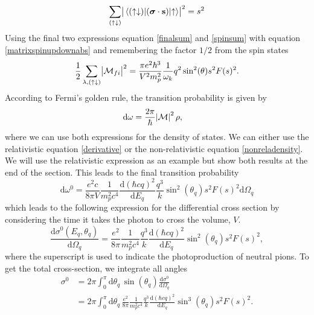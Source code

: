 \begin{equation} \label{spinsum}
	\sum_{(\uparrow\downarrow)} \abs{\mel*{(\uparrow\downarrow)}{(\bm{\mathrm{\sigma}}\cdot\bm{\mathrm{s}})}{\uparrow}}^2 = s^2
\end{equation}
Using the final two expressions equation \eqref{finalsum} and \eqref{spinsum} with equation \eqref{matrixspinupdownabs} and remembering the factor $1/2$ from the spin states
\begin{equation} \label{absmatrixexact}
	\frac{1}{2}\sum_{\lambda,(\uparrow\downarrow)} \abs{\mathcal{M}_{fi}}^2 = \frac{\pi e^2\hbar^3}{V^2 m_p^2}\frac{1}{\omega_k} q^2\sin^2(\theta) s^2 F(s)^2.
\end{equation}
According to Fermi's golden rule, the transition probability is given by
\begin{align}\label{Fermisgolden}
	\text{d}\omega &= \frac{2\pi}{\hbar}\abs{\mathcal{M}}^2\rho,
\end{align}
where we can use both expressions for the density of states. We can either use the relativistic equation \eqref{derivative} or the non-relativistic equation \eqref{nonreladensity}. We will use the relativistic expression as an example but show both results at the end of the section. This leads to the final transition probability
\begin{equation}
	\text{d}\omega^0 = \frac{e^2c}{8\pi V}\frac{1}{m_p^2 c^4}\frac{\text{d}(\hbar c q)^2}{\text{d}E_q}\frac{q^3}{k} \sin^2(\theta_q) s^2 F(s)^2 \text{d}\Omega_q
\end{equation}
which leads to the following expression for the differential cross section by considering the time it takes the photon to cross the volume, $V$.
\begin{equation}\label{exactdiffcross}
	\frac{\text{d}\sigma^0(E_q,\theta_q)}{\text{d}\Omega_q} = \frac{e^2}{8\pi}\frac{1}{m_p^2c^4}\frac{q^3}{k}\frac{\text{d}(\hbar c q)^2}{\text{d}E_q}\sin^2(\theta_q) s^2 F(s)^2,
\end{equation}
where the superscript is used to indicate the photoproduction of neutral pions. To get the total cross-section, we integrate all angles
\begin{align} \label{exactcross}
	\sigma^0 & = 2\pi \int_0^\pi \text{d}\theta_q \, \sin(\theta_q) \frac{\text{d}\sigma^0}{\text{d}\Omega_q} \\ &= 2\pi \int_0^\pi \text{d}\theta_q \, \frac{e^2}{8\pi}\frac{1}{m_p^2c^4}\frac{q^3}{k}\frac{\text{d}(\hbar c q)^2}{\text{d}E_q}\sin^3(\theta_q) s^2 F(s)^2 \label{finalcrosser}.
\end{align}
